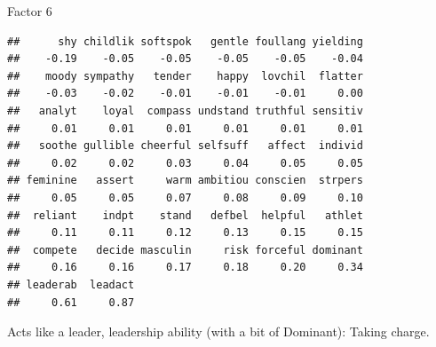 \begin{frame}[fragile]{Factor 6}
  
  {\footnotesize
\begin{knitrout}
\color{fgcolor}\begin{kframe}
\begin{alltt}
\hlstd{mylist[[}\hlstd{]]}
\end{alltt}
\begin{verbatim}
##      shy childlik softspok   gentle foullang yielding 
##    -0.19    -0.05    -0.05    -0.05    -0.05    -0.04 
##    moody sympathy   tender    happy  lovchil  flatter 
##    -0.03    -0.02    -0.01    -0.01    -0.01     0.00 
##   analyt    loyal  compass undstand truthful sensitiv 
##     0.01     0.01     0.01     0.01     0.01     0.01 
##   soothe gullible cheerful selfsuff   affect  individ 
##     0.02     0.02     0.03     0.04     0.05     0.05 
## feminine   assert     warm ambitiou conscien  strpers 
##     0.05     0.05     0.07     0.08     0.09     0.10 
##  reliant    indpt    stand   defbel  helpful   athlet 
##     0.11     0.11     0.12     0.13     0.15     0.15 
##  compete   decide masculin     risk forceful dominant 
##     0.16     0.16     0.17     0.18     0.20     0.34 
## leaderab  leadact 
##     0.61     0.87
\end{verbatim}
\end{kframe}
\end{knitrout}
}

Acts like a leader, leadership ability (with a bit of Dominant):
Taking charge.

\end{frame}
